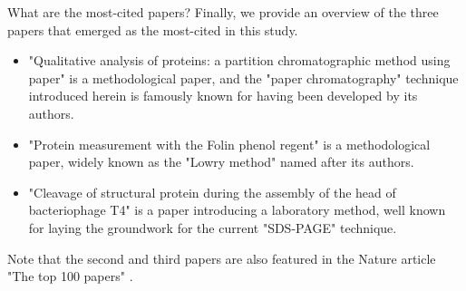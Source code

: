 What are the most-cited papers?
Finally, we provide an overview of the three papers that emerged as the most-cited in this study.
\begin{itemize}
\item "Qualitative analysis of proteins: a partition chromatographic method using paper" is a methodological paper, and the "paper chromatography" technique introduced herein is famously known for having been developed by its authors.
\item "Protein measurement with the Folin phenol regent" is a methodological paper, widely known as the "Lowry method" named after its authors.
\item "Cleavage of structural protein during the assembly of the head of bacteriophage T4" is a paper introducing a laboratory method, well known for laying the groundwork for the current "SDS-PAGE" technique.
\end{itemize}
Note that the second and third papers are also featured in the Nature article "The top 100 papers" \cite{Nor1}.

